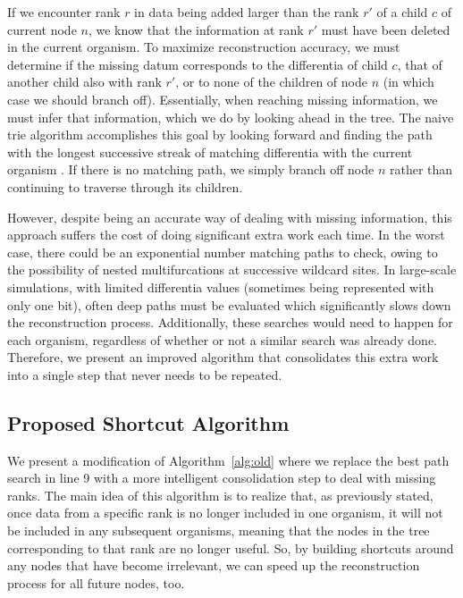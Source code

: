 If we encounter rank $r$ in data being added larger than the rank $r'$ of a child $c$ of current node $n$, we know that the information at rank $r'$ must have been deleted in the current organism.
To maximize reconstruction accuracy, we must determine if the missing datum corresponds to the differentia of child $c$, that of another child also with rank $r'$, or to none of the children of node $n$ (in which case we should branch off).
Essentially, when reaching missing information, we must infer that information, which we do by looking ahead in the tree.
The naive  trie algorithm accomplishes this goal by looking forward and finding the path with the longest successive streak of matching differentia with the current organism \citep{moreno2024analysis}.
If there is no matching path, we simply branch off node $n$ rather than continuing to traverse through its children.

However, despite being an accurate way of dealing with missing information, this approach suffers the cost of doing significant extra work each time.
In the worst case, there could be an exponential number matching paths to check, owing to the possibility of nested multifurcations at successive wildcard sites.
In large-scale simulations, with limited differentia values (sometimes being represented with only one bit), often deep paths must be evaluated which significantly slows down the reconstruction process.
Additionally, these searches would need to happen for each organism, regardless of whether or not a similar search was already done.
Therefore, we present an improved algorithm that consolidates this extra work into a single step that never needs to be repeated.

\subsection{Proposed Shortcut Algorithm} \label{sec:algorithm:shortcut}



We present a modification of Algorithm~\ref{alg:old} where we replace the best path search in line 9 with a more intelligent consolidation step to deal with missing ranks.
The main idea of this algorithm is to realize that, as previously stated, once data from a specific rank is no longer included in one organism, it will not be included in any subsequent organisms, meaning that the nodes in the tree corresponding to that rank are no longer useful.
So, by building shortcuts around any nodes that have become irrelevant, we can speed up the reconstruction process for all future nodes, too.

